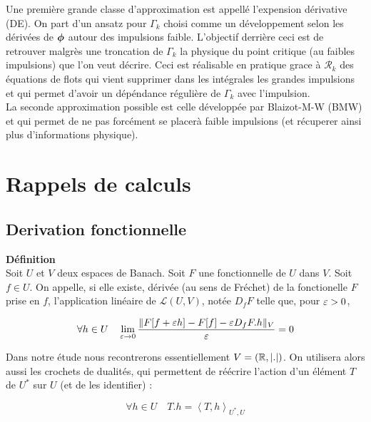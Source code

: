 \documentclass[10pt]{article}
\begin{document}
\begin{multicols}{2}
Une première grande classe d'approximation est appellé l'expension dérivative (DE). On part d'un ansatz pour $\Gamma_k$ choisi comme un développement selon les dérivées de $\boldsymbol{ \phi}$ autour des impulsions faible. L'objectif derrière ceci est de retrouver malgrès une troncation de $\Gamma_k$ la physique du point critique (au faibles impulsions) que l'on veut décrire. Ceci est réalisable en pratique grace à $\mathcal{R}_k$ des équations de flots qui vient supprimer dans les intégrales les grandes impulsions et qui permet d'avoir un dépéndance régulière de $\Gamma_k$ avec l'impulsion. \\

La seconde approximation possible est celle développée par Blaizot-M-W (BMW) et qui permet de ne pas forcément se placerà faible impulsions (et récuperer ainsi plus d'informations physique). 







\newpage
\null
\newpage

\appendix

\section{Rappels de calculs}

\subsection{Derivation fonctionnelle}


\textbf{Définition}\\
Soit $U$ et $V$ deux espaces de Banach. Soit $F$ une fonctionnelle de $U$ dans $V$. 
Soit $f \in U$. On appelle, si elle existe, dérivée (au sens de Fréchet) de la fonctionelle $F$ prise en $f$, l'application linéaire de $\mathcal{L}(U,V)$, notée $D_fF$ telle que, pour $\varepsilon>0$, 

\begin{equation}
\forall h \in U \quad \lim_{ \varepsilon \rightarrow 0 } \frac{\| F[f+\varepsilon h] - F[f] - \varepsilon D_fF.h\|_V}{\varepsilon}  = 0
\end{equation} 


Dans notre étude nous recontrerons essentiellement $V = (\mathbb{R}, |.|)$. On utilisera alors aussi les crochets de dualités, qui permettent de réécrire l'action d'un élément $T$ de $U^*$ sur $U$ (et de les identifier) : 

\begin{equation}
  \forall h \in U \quad T.h = \left< T, h \right>_{U^*, U}
\end{equation}


\end{multicols}
\end{document}

